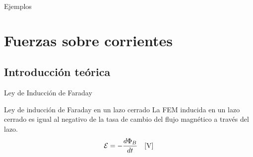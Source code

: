 \documentclass[]{presentation}
\begin{document}
\begin{frame}{Ejemplos}
\begin{figure}
	\centering
\end{figure}
\end{frame}

\section{Fuerzas sobre corrientes}
\subsection{Introducción teórica}
\begin{frame}{Ley de Inducción de Faraday}
	\begin{block}{Ley de inducción de Faraday en un lazo cerrado}
		La FEM inducida en un lazo cerrado es igual al negativo de la tasa de cambio del flujo magnético a través del lazo.
		$$
		\mathcal{E} = - \frac{d\Phi_B}{dt} \ \ \ [\text{V}]
		$$
	\end{block}
\end{frame}
\end{document}
